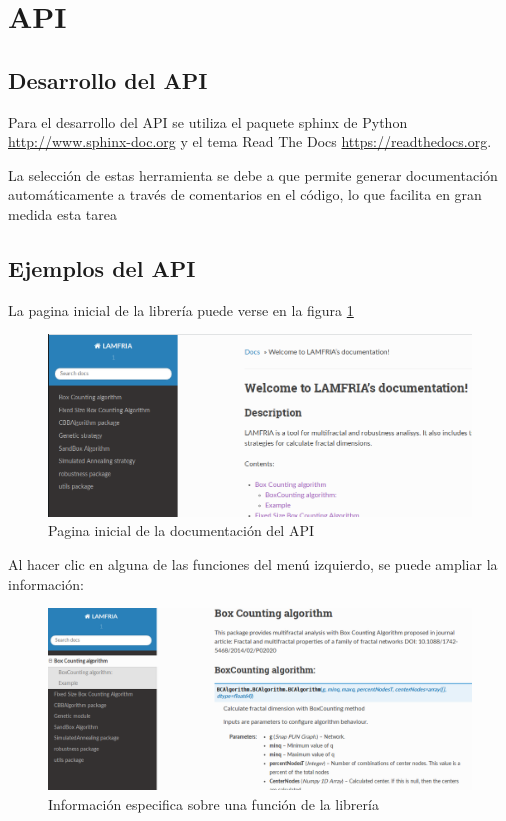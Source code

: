\section{API}

\subsection{Desarrollo del API}

Para el desarrollo del API se utiliza el paquete sphinx de Python \url{http://www.sphinx-doc.org} y el tema Read The Docs \url{https://readthedocs.org}.

La selección de estas herramienta se debe a que permite generar documentación automáticamente a través de comentarios en el código, lo que facilita en gran medida esta tarea

\subsection{Ejemplos del API}

La pagina inicial de la librería puede verse en la figura  \ref{fig:lamfriaA}

\begin{figure}[H]
    \centering
    \includegraphics[scale=0.45]{Capitulo7Libreria/imagenes/lamfriaA.png}
    \caption{Pagina inicial de la documentación del API}
    \label{fig:lamfriaA}
\end{figure}

Al hacer clic en alguna de las funciones del menú izquierdo, se puede ampliar la información:


\begin{figure}[H]
    \centering
    \includegraphics[scale=0.4]{Capitulo7Libreria/imagenes/lamfriaB.png}
    \caption{Información especifica sobre una función de la librería}
    \label{fig:lamfriaB}
\end{figure}


